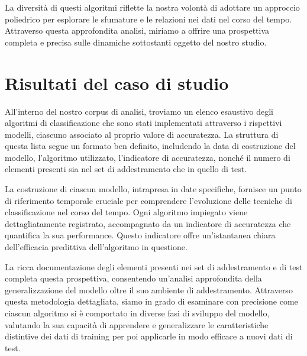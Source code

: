 La diversità di questi algoritmi riflette la nostra volontà di adottare un approccio poliedrico per esplorare le sfumature e le relazioni nei dati nel corso del tempo.
Attraverso questa approfondita analisi, miriamo a offrire una prospettiva completa e precisa sulle dinamiche sottostanti oggetto del nostro studio.

\section[Risultati]{Risultati del caso di studio}

All'interno del nostro corpus di analisi, troviamo un elenco esaustivo degli algoritmi di classificazione che sono stati implementati attraverso i rispettivi modelli, ciascuno associato al proprio valore di accuratezza.
La struttura di questa lista segue un formato ben definito, includendo la data di costruzione del modello, l'algoritmo utilizzato, l'indicatore di accuratezza, nonché il numero di elementi presenti sia nel set di addestramento che in quello di test.

La costruzione di ciascun modello, intrapresa in date specifiche, fornisce un punto di riferimento temporale cruciale per comprendere l'evoluzione delle tecniche di classificazione nel corso del tempo.
Ogni algoritmo impiegato viene dettagliatamente registrato, accompagnato da un indicatore di accuratezza che quantifica la sua performance.
Questo indicatore offre un'istantanea chiara dell'efficacia predittiva dell'algoritmo in questione.

La ricca documentazione degli elementi presenti nei set di addestramento e di test completa questa prospettiva, consentendo un'analisi approfondita della generalizzazione del modello oltre il suo ambiente di addestramento.
Attraverso questa metodologia dettagliata, siamo in grado di esaminare con precisione come ciascun algoritmo si è comportato in diverse fasi di sviluppo del modello, valutando la sua capacità di apprendere e generalizzare le caratteristiche distintive dei dati di training per poi applicarle in modo efficace a nuovi dati di test.
  
